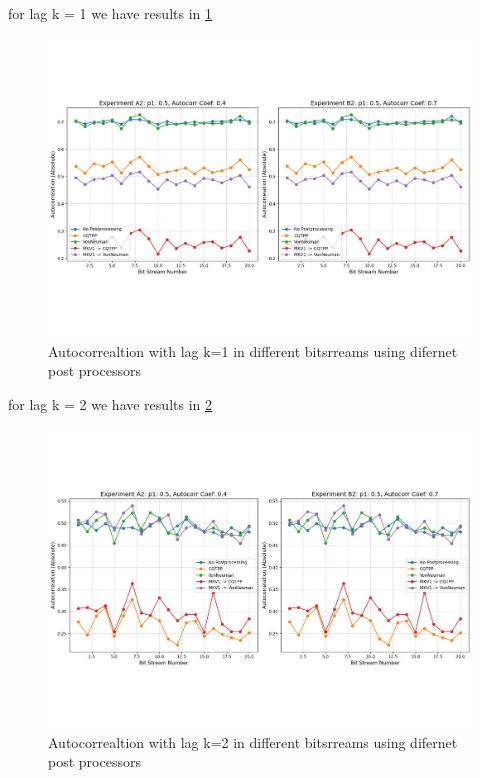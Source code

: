for lag k = 1 we have results in \ref{fig:grph4}

\begin{figure}[h!]
    \centering
    \includegraphics[width=\textwidth]{figures/AutoCorr.pdf}
    \caption{Autocorrealtion with lag k=1 in different bitsrreams using difernet post processors}
    \label{fig:grph4}
\end{figure}

\noindent for lag k = 2 we have results in \ref{fig:grph5}

\begin{figure}[h!]
    \centering
    \includegraphics[width=\textwidth]{figures/AutoCorrLag2.pdf}
    \caption{Autocorrealtion with lag k=2 in different bitsrreams using difernet post processors}
    \label{fig:grph5}
\end{figure}

